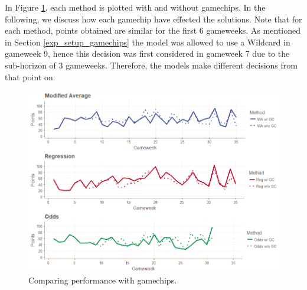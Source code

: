 \begin{table}[H]
\centering
{}
\caption{Results including gamechips.}
\label{tab:res_incl_gamechips}
\end{table}



In Figure \ref{fig:res_comp_gamechips}, each method is plotted with and without gamechips. In the following, we discuss how each gamechip have effected the solutions. Note that for each method, points obtained are similar for the first 6 gameweeks. As mentioned in Section \ref{exp_setup_gamechips} the model was allowed to use a Wildcard in gameweek 9, hence this decision was first considered in gameweek 7 due to the sub-horizon of 3 gameweeks. Therefore, the models make different decisions from that point on.

\begin{figure}[H]
    \centering
    \includegraphics[scale=0.5]{fig/chapter_7/w_wo_gc_all.png}
    \caption{Comparing performance with gamechips.}
\label{fig:res_comp_gamechips}    
\end{figure}


